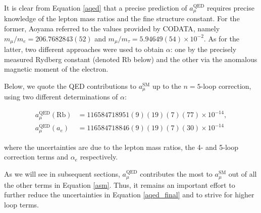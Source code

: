 \documentclass{article}
\numberwithin{equation}{section} %
\begin{document}
It is clear from Equation \ref{aqed} that a precise prediction of $a_\mu^\mathrm{QED}$ requires precise knowledge of the lepton mass ratios and the fine structure constant. For the former, Aoyama referred to the values provided by CODATA\cite{codata}, namely $m_\mu /m_e = 206.7682843(52)$ and $m_\mu /m_\tau = 5.94649(54) \times 10^{-2}$. As for the latter, two different approaches were used to obtain $\alpha$: one by the precisely measured Rydberg constant (denoted Rb below) and the other via the anomalous magnetic moment of the electron. 

Below, we quote the QED contributions to $a_\mu^\mathrm{SM}$ up to the $n=5$-loop correction, using two different determinations of $\alpha$:

\begin{equation}
\begin{split}
a_\mu^\mathrm{QED}(\mathrm{Rb}) &= 116584718951(9)(19)(7)(77)\times 10^{-14},\\
a_\mu^\mathrm{QED}(a_e) &= 116584718846(9)(19)(7)(30)\times 10^{-14}
\end{split}
\label{aqed_final}
\end{equation}

\noindent where the uncertainties are due to the lepton mass ratios, the 4- and 5-loop correction terms and $\alpha_e$ respectively.

As we will see in subsequent sections, $a_\mu^\mathrm{QED}$  contributes the most to $a_\mu^\mathrm{SM}$ out of all the other terms in Equation \ref{asm}. Thus, it remains an important effort to further reduce the uncertainties in Equation \ref{aqed_final} and to strive for higher loop terms.
\end{document}
